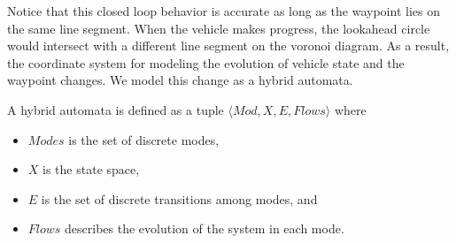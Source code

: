 
Notice that this closed loop behavior is accurate as long as the waypoint lies on the same line segment.
%
When the vehicle makes progress, the lookahead circle would intersect with a different line segment on the voronoi diagram.
%
As a result, the coordinate system for modeling the evolution of vehicle state and the waypoint changes.
%
We model this change as a hybrid automata.

\begin{definition} 
A hybrid automata is defined as a tuple $\langle Mod, X, E, Flows \rangle$ where
\begin{itemize}
    \item \textbf{$Modes$} is the set of discrete modes,
    \item \textbf{$X$} is the state space,
    \item \textbf{$E$} is the set of discrete transitions among modes, and
    \item \textbf{$Flows$} describes the evolution of the system in each mode.
\end{itemize}
\end{definition}

